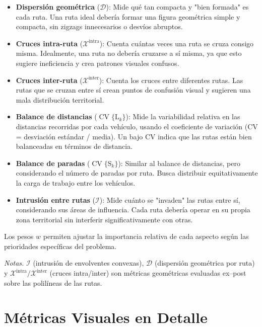 \documentclass[11pt, a4paper]{article}
\DeclareMathOperator{\CV}{CV}
\begin{document}
\begin{itemize}
\item \textbf{Dispersión geométrica} ($\mathcal{D}$): Mide qué tan compacta y "bien formada" es cada ruta. Una ruta ideal debería formar una figura geométrica simple y compacta, sin zigzags innecesarios o desvíos abruptos.

\item \textbf{Cruces intra-ruta} ($\mathcal{X}^{\text{intra}}$): Cuenta cuántas veces una ruta se cruza consigo misma. Idealmente, una ruta no debería cruzarse a sí misma, ya que esto sugiere ineficiencia y crea patrones visuales confusos.

\item \textbf{Cruces inter-ruta} ($\mathcal{X}^{\text{inter}}$): Cuenta los cruces entre diferentes rutas. Las rutas que se cruzan entre sí crean puntos de confusión visual y sugieren una mala distribución territorial.

\item \textbf{Balance de distancias} ($\CV\{\text{L}_k\}$): Mide la variabilidad relativa en las distancias recorridas por cada vehículo, usando el coeficiente de variación (CV = desviación estándar / media). Un bajo CV indica que las rutas están bien balanceadas en términos de distancia.

\item \textbf{Balance de paradas} ($\CV\{\text{S}_k\}$): Similar al balance de distancias, pero considerando el número de paradas por ruta. Busca distribuir equitativamente la carga de trabajo entre los vehículos.

\item \textbf{Intrusión entre rutas} ($\mathcal{I}$): Mide cuánto se "invaden" las rutas entre sí, considerando sus áreas de influencia. Cada ruta debería operar en su propia zona territorial sin interferir significativamente con otras.
\end{itemize}

Los pesos $w$ permiten ajustar la importancia relativa de cada aspecto según las prioridades específicas del problema.


\noindent
\textit{Notas.} 
$\mathcal{I}$ (intrusión de envolventes convexas), 
$\mathcal{D}$ (dispersión geométrica por ruta) y 
$\mathcal{X}^{\text{intra}}/\mathcal{X}^{\text{inter}}$ (cruces intra/inter)
son métricas geométricas evaluadas ex--post sobre las polilíneas de las rutas.

\section{Métricas Visuales en Detalle}
\end{document}
